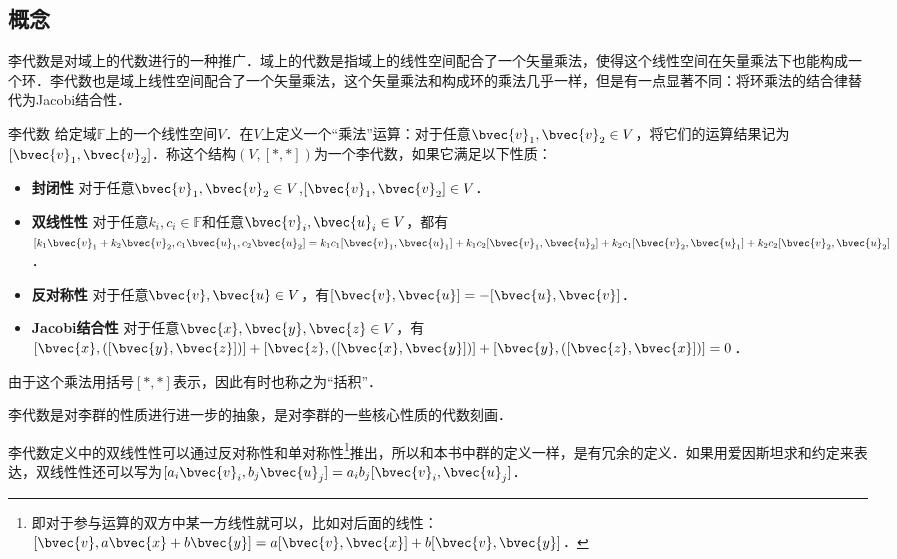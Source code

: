 
\subsection{概念}

李代数是对域上的代数进行的一种推广．域上的代数是指域上的线性空间配合了一个矢量乘法，使得这个线性空间在矢量乘法下也能构成一个环．李代数也是域上线性空间配合了一个矢量乘法，这个矢量乘法和构成环的乘法几乎一样，但是有一点显著不同：将环乘法的结合律替代为Jacobi结合性．

\begin{definition}{李代数}
给定域$\mathbb{F}$上的一个线性空间$V$．在$V$上定义一个“乘法”运算：对于任意$\bvec{v}_1, \bvec{v}_2\in V$，将它们的运算结果记为$[\bvec{v}_1, \bvec{v}_2]$．称这个结构$(V, [*, *])$为一个李代数，如果它满足以下性质：
\begin{itemize}
\item \textbf{封闭性} 对于任意$\bvec{v}_1, \bvec{v}_2\in V$,$[\bvec{v}_1, \bvec{v}_2]\in V$．
\item \textbf{双线性性} 对于任意$k_i, c_i\in \mathbb{F}$和任意$\bvec{v}_i, \bvec{u}_i\in V$，都有$[k_1\bvec{v}_1+k_2\bvec{v}_2, c_1\bvec{u}_1, c_2\bvec{u}_2]=k_1c_1[\bvec{v}_1, \bvec{u}_1]+k_1c_2[\bvec{v}_1, \bvec{u}_2]+k_2c_1[\bvec{v}_2, \bvec{u}_1]+k_2c_2[\bvec{v}_2, \bvec{u}_2]$．
\item \textbf{反对称性} 对于任意$\bvec{v}, \bvec{u}\in V$，有$[\bvec{v}, \bvec{u}]=-[\bvec{u}, \bvec{v}]$．
\item \textbf{Jacobi结合性} 对于任意$\bvec{x}, \bvec{y}, \bvec{z}\in V$，有$[\bvec{x}, ([\bvec{y}, \bvec{z}])]+[\bvec{z}, ([\bvec{x}, \bvec{y}])]+[\bvec{y}, ([\bvec{z}, \bvec{x}])]=0$．
\end{itemize}

由于这个乘法用括号$[*, *]$表示，因此有时也称之为“括积”．
\end{definition}

李代数是对李群的性质进行进一步的抽象，是对李群的一些核心性质的代数刻画．

李代数定义中的双线性性可以通过反对称性和单对称性\footnote{即对于参与运算的双方中某一方线性就可以，比如对后面的线性：$[\bvec{v},a\bvec{x}+b\bvec{y}]=a[\bvec{v}, \bvec{x}]+b[\bvec{v}, \bvec{y}]$．}推出，所以和本书中群的定义一样，是有冗余的定义．如果用爱因斯坦求和约定来表达，双线性性还可以写为$[a_i\bvec{v}_i, b_j\bvec{u}_j]=a_ib_j[\bvec{v}_i, \bvec{u}_j]$．


